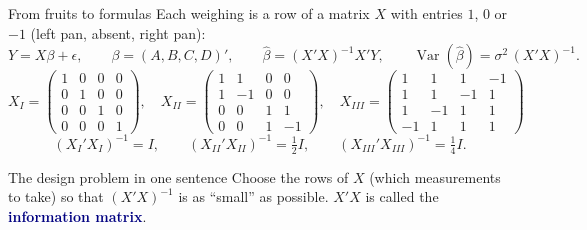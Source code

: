 \documentclass[aspectratio=169,10pt]{beamer}
\newcommand{\key}[1]{\textcolor{navy}{\textbf{#1}}}
\newcommand{\Var}{\operatorname{Var}}
\begin{document}
\begin{frame}{From fruits to formulas}
  Each weighing is a row of a matrix $X$ with entries $1$, $0$ or $-1$ (left pan, absent, right pan):
  \[
    Y = X\beta + \epsilon,\qquad \beta=(A,B,C,D)',\qquad
    \hat\beta = (X'X)^{-1}X'Y,\qquad \Var(\hat\beta) = \sigma^2\,(X'X)^{-1}.
  \]
  \vspace{-0.5em}
  \[
    X_{I} = \begin{pmatrix} 1&0&0&0\\0&1&0&0\\0&0&1&0\\0&0&0&1\end{pmatrix},\quad
    X_{II} = \begin{pmatrix} 1&1&0&0\\1&-1&0&0\\0&0&1&1\\0&0&1&-1\end{pmatrix},\quad
    X_{III} = \begin{pmatrix} 1&1&1&-1\\1&1&-1&1\\1&-1&1&1\\-1&1&1&1\end{pmatrix}
  \]
  \[
    (X_I'X_I)^{-1} = I,\qquad (X_{II}'X_{II})^{-1} = \tfrac12 I,\qquad (X_{III}'X_{III})^{-1} = \tfrac14 I.
  \]
  \begin{alertblock}{The design problem in one sentence}
    Choose the rows of $X$ (which measurements to take) so that $(X'X)^{-1}$ is as ``small'' as possible.
    $X'X$ is called the \key{information matrix}.
  \end{alertblock}
\end{frame}
\end{document}
